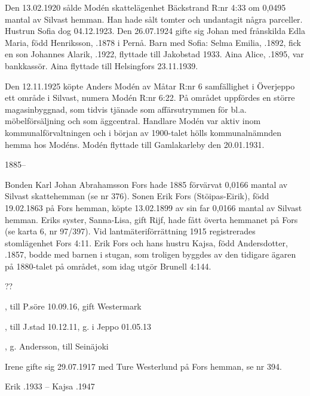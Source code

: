 Den 13.02.1920 sålde Modén skattelägenhet Bäckstrand R:nr 4:33 om 0,0495 mantal av Silvast hemman. Han hade sålt tomter och undantagit några parceller. Hustrun Sofia dog 04.12.1923. Den 26.07.1924 gifte sig Johan med frånskilda Edla Maria, född Henriksson, .1878 i Pernå.
Barn med Sofia:
Selma Emilia, .1892, fick en son Johannes Alarik, .1922, flyttade till Jakobstad 1933.
Aina Alice, .1895, var bankkassör. Aina flyttade till Helsingfors 23.11.1939.

Den 12.11.1925 köpte Anders Modén av Måtar R:nr 6 samfällighet i Överjeppo ett område i Silvast, numera Modén R:nr 6:22. På området uppfördes en större magasinbyggnad, som tidvis tjänade som affärsutrymmen för bl.a. möbelförsäljning och som äggcentral. Handlare Modén var aktiv inom kommunalförvaltningen och i början av 1900-talet hölls kommunalnämnden hemma hos Modéns. Modén flyttade till Gamlakarleby den 20.01.1931.


 1885--

Bonden Karl Johan Abrahamsson Fors hade 1885 förvärvat 0,0166 mantal av Silvast skattehemman (se nr 376).
Sonen Erik Fors (Stöipas-Eirik), född 19.02.1863 på Fors hemman, köpte 13.02.1899 av sin far 0,0166 mantal av Silvast hemman. Eriks syster, Sanna-Lisa, gift Rijf, hade fått överta hemmanet på Fors (se karta 6, nr 97/397). Vid lantmäteriförrättning 1915 registrerades stomlägenhet Fors 4:11. Erik Fors och hans hustru Kajsa, född Andersdotter, .1857, bodde med barnen i stugan, som troligen byggdes av den tidigare ägaren på 1880-talet på området, som idag utgör Brunell 4:144.
\begin{jhchildren}
  \item {} ??
  \item {}, till P.söre 10.09.16, gift Westermark
  \item {}, till J.stad 10.12.11, g. i Jeppo 01.05.13
  \item {}, g. Andersson, till Seinäjoki
\end{jhchildren}
Irene gifte sig 29.07.1917 med Ture Westerlund på Fors hemman, se nr 394.

Erik .1933  --  Kajsa .1947

